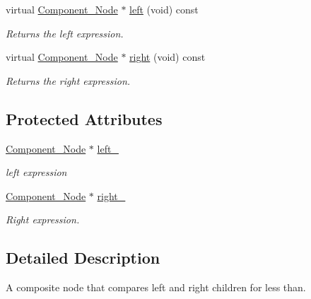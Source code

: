 \begin{DoxyCompactItemize}
virtual \hyperlink{classMadara_1_1Expression__Tree_1_1Component__Node}{Component\_\-Node} $\ast$ \hyperlink{classMadara_1_1Expression__Tree_1_1Composite__Binary__Node_a6ca5cccbc46ccc6026c18f9665298380}{left} (void) const 
\begin{DoxyCompactList}\small\item\em Returns the left expression. \item\end{DoxyCompactList}\item 
virtual \hyperlink{classMadara_1_1Expression__Tree_1_1Component__Node}{Component\_\-Node} $\ast$ \hyperlink{classMadara_1_1Expression__Tree_1_1Composite__Unary__Node_ade55cde5707e0fa73ab1c019159b9aec}{right} (void) const 
\begin{DoxyCompactList}\small\item\em Returns the right expression. \item\end{DoxyCompactList}\end{DoxyCompactItemize}
\subsection*{Protected Attributes}
\begin{DoxyCompactItemize}
\item 
\hyperlink{classMadara_1_1Expression__Tree_1_1Component__Node}{Component\_\-Node} $\ast$ \hyperlink{classMadara_1_1Expression__Tree_1_1Composite__Binary__Node_acac60a70beb2484737e6e7161edb2d1b}{left\_\-}
\begin{DoxyCompactList}\small\item\em left expression \item\end{DoxyCompactList}\item 
\hyperlink{classMadara_1_1Expression__Tree_1_1Component__Node}{Component\_\-Node} $\ast$ \hyperlink{classMadara_1_1Expression__Tree_1_1Composite__Unary__Node_a077b7bd1b52df6f5c6adfde735556a68}{right\_\-}
\begin{DoxyCompactList}\small\item\em Right expression. \item\end{DoxyCompactList}\end{DoxyCompactItemize}


\subsection{Detailed Description}
A composite node that compares left and right children for less than. 

